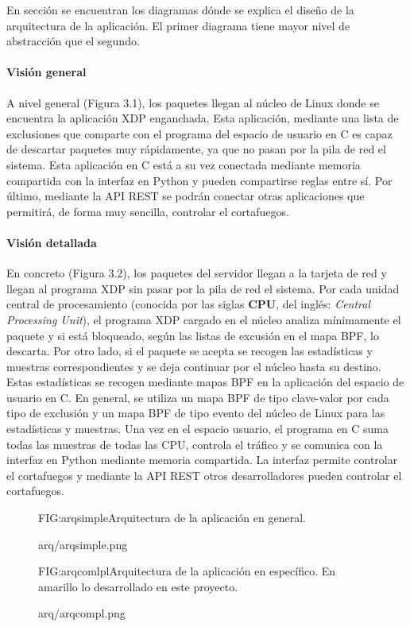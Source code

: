 En sección se encuentran los diagramas dónde se explica el diseño de la arquitectura de la aplicación. El primer diagrama tiene mayor nivel de abstracción que el segundo. 
\paragraph{Visión general}

A nivel general (Figura 3.1), los paquetes llegan al núcleo de Linux donde se encuentra la aplicación XDP enganchada. Esta aplicación, mediante una lista de exclusiones que comparte con el programa del espacio de usuario en C es capaz de descartar paquetes muy rápidamente, ya que no pasan por la pila de red el sistema. Esta aplicación en C está a su vez conectada mediante memoria compartida con la interfaz en Python y pueden compartirse reglas entre sí. Por último, mediante la API REST se podrán conectar otras aplicaciones que permitirá, de forma muy sencilla, controlar el cortafuegos.
\paragraph{Visión detallada}
En concreto (Figura 3.2), los paquetes del servidor llegan a la tarjeta de red y llegan al programa XDP sin pasar por la pila de red el sistema. Por cada unidad central de procesamiento (conocida por las siglas \textbf{CPU}, del inglés:\textit{ Central Processing Unit}), el programa XDP cargado en el núcleo analiza mínimamente el paquete y si está  bloqueado, según las listas de excusión en el mapa BPF, lo descarta. Por otro lado, si el paquete se acepta se recogen las estadísticas y muestras correspondientes y se deja continuar por el núcleo hasta su destino. Estas estadísticas 
se recogen mediante mapas BPF en la aplicación del espacio de usuario en C. En general, se utiliza un mapa BPF de tipo clave-valor por cada tipo de exclusión y un mapa BPF de tipo evento del núcleo de Linux para las estadísticas y muestras. Una vez en el espacio usuario, el programa en C suma todas las muestras de todas las CPU, controla el tráfico y se comunica con la interfaz en Python mediante memoria compartida. La interfaz permite controlar el cortafuegos y mediante la API REST otros desarrolladores pueden controlar el cortafuegos.
\begin{figure}[Arquitectura de la aplicación en general.]{FIG:arqsimple}{Arquitectura de la aplicación en general.}
  \begin{image}{}{}{arq/arqsimple.png}
  \end{image}
\end{figure}
\begin{figure}[Arquitectura de la aplicación en específico.]{FIG:arqcomlpl}{Arquitectura de la aplicación en específico. En amarillo lo desarrollado en este proyecto.}
  \begin{image}{}{}{arq/arqcompl.png}
  \end{image}
\end{figure}

